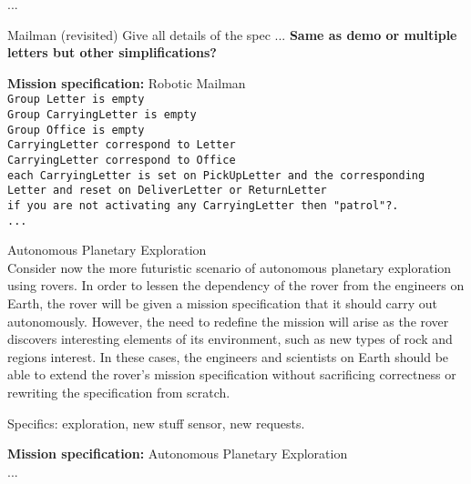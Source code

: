 ...

\begin{myExample}\label{Ex:mission1} Mailman (revisited)
	Give all details of the spec ... \textbf{Same as demo or multiple letters but other simplifications?}
\end{myExample}

\begin{algorithm}
	\textbf{Mission specification:} Robotic Mailman\\
	{\small
	\texttt{Group Letter is empty}\\
	\texttt{Group CarryingLetter is empty}\\
	\texttt{Group Office is empty}\\
	\texttt{CarryingLetter correspond to Letter}\\
	\texttt{CarryingLetter correspond to Office}\\
	\texttt{each CarryingLetter is set on PickUpLetter and the corresponding Letter and reset on 			DeliverLetter or ReturnLetter}\\
	
	\texttt{if you are not activating any CarryingLetter then "patrol"?.}\\
	\texttt{...}
	}
\end{algorithm}

\begin{myExample}\label{Ex:mission2} Autonomous Planetary Exploration\\
	Consider now the more futuristic scenario of autonomous planetary exploration using rovers. In order to lessen the dependency of the rover from the engineers on Earth, the rover will be given a mission specification that it should carry out autonomously. However, the need to redefine the mission will arise as the rover discovers interesting elements of its environment, such as new types of rock and regions interest. In these cases, the engineers and scientists on Earth should be able to extend the rover's mission specification without sacrificing correctness or rewriting the specification from scratch.
	
	Specifics: exploration, new stuff sensor, new requests.
\end{myExample}

\begin{algorithm}
	\textbf{Mission specification:} Autonomous Planetary Exploration\\
	...
\end{algorithm}